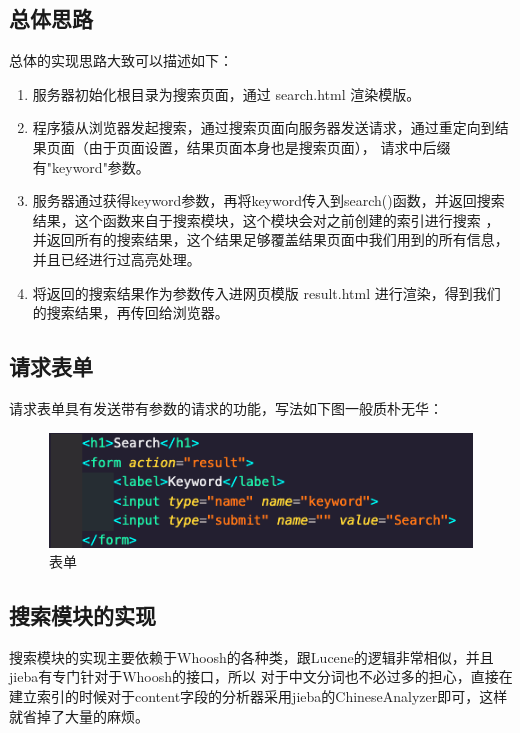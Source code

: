 \documentclass[UTF8]{ctexart}
\begin{document}
        \subsection{总体思路}
            总体的实现思路大致可以描述如下：
            \begin{enumerate}
                \item 服务器初始化根目录为搜索页面，通过 search.html 渲染模版。
                \item 程序猿从浏览器发起搜索，通过搜索页面向服务器发送请求，通过重定向到结果页面（由于页面设置，结果页面本身也是搜索页面），
                请求中后缀有"keyword"参数。
                \item 服务器通过获得keyword参数，再将keyword传入到search()函数，并返回搜索结果，这个函数来自于搜索模块，这个模块会对之前创建的索引进行搜索
                ，并返回所有的搜索结果，这个结果足够覆盖结果页面中我们用到的所有信息，并且已经进行过高亮处理。
                \item 将返回的搜索结果作为参数传入进网页模版 result.html 进行渲染，得到我们的搜索结果，再传回给浏览器。
            \end{enumerate}

        \subsection{请求表单}
            请求表单具有发送带有参数的请求的功能，写法如下图一般质朴无华：
            \begin{figure}[ht]
                \centering
                \includegraphics[scale=0.6]{img/form.png}
                \caption{表单}
            \end{figure}
        \subsection{搜索模块的实现}
            搜索模块的实现主要依赖于Whoosh的各种类，跟Lucene的逻辑非常相似，并且jieba有专门针对于Whoosh的接口，所以
            对于中文分词也不必过多的担心，直接在建立索引的时候对于content字段的分析器采用jieba的ChineseAnalyzer即可，这样就省掉了大量的麻烦。
\end{document}

